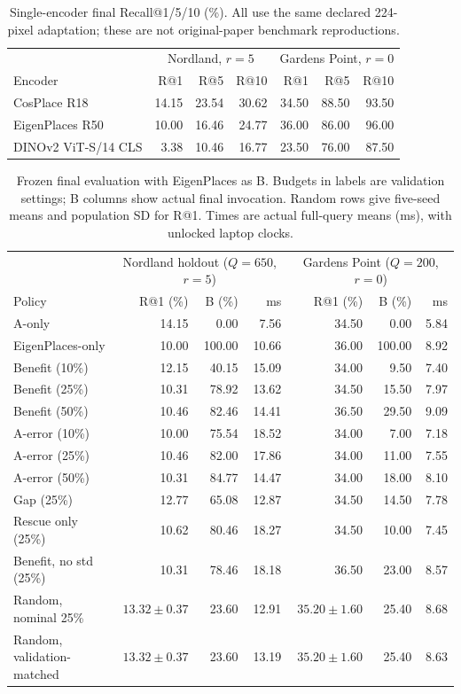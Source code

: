 \documentclass[conference]{IEEEtran}
\begin{document}
\begin{table}[t]
\caption{Single-encoder final Recall@1/5/10 (\%). All use the same declared 224-pixel adaptation; these are not original-paper benchmark reproductions.}
\label{tab:baselines}
\centering
\begin{tabular}{lrrr rrr}
\toprule
&\multicolumn{3}{c}{Nordland, $r=5$}&\multicolumn{3}{c}{Gardens Point, $r=0$}\\
Encoder & R@1 & R@5 & R@10 & R@1 & R@5 & R@10\\
\midrule
CosPlace R18 & 14.15 & 23.54 & 30.62 & 34.50 & 88.50 & 93.50\\
EigenPlaces R50 & 10.00 & 16.46 & 24.77 & 36.00 & 86.00 & 96.00\\
DINOv2 ViT-S/14 CLS & 3.38 & 10.46 & 16.77 & 23.50 & 76.00 & 87.50\\
\bottomrule
\end{tabular}
\end{table}
\begin{table}[t]
\caption{Frozen final evaluation with EigenPlaces as B. Budgets in labels are validation settings; B columns show actual final invocation. Random rows give five-seed means and population SD for R@1. Times are actual full-query means (ms), with unlocked laptop clocks.}
\label{tab:final}
\centering
\begin{tabular}{lrrr rrr}
\toprule
&\multicolumn{3}{c}{Nordland holdout ($Q=650$, $r=5$)}&\multicolumn{3}{c}{Gardens Point ($Q=200$, $r=0$)}\\
Policy & R@1 (\%) & B (\%) & ms & R@1 (\%) & B (\%) & ms\\
\midrule
A-only & 14.15 & 0.00 & 7.56 & 34.50 & 0.00 & 5.84\\
EigenPlaces-only & 10.00 & 100.00 & 10.66 & 36.00 & 100.00 & 8.92\\
Benefit (10\%) & 12.15 & 40.15 & 15.09 & 34.00 & 9.50 & 7.40\\
Benefit (25\%) & 10.31 & 78.92 & 13.62 & 34.50 & 15.50 & 7.97\\
Benefit (50\%) & 10.46 & 82.46 & 14.41 & 36.50 & 29.50 & 9.09\\
A-error (10\%) & 10.00 & 75.54 & 18.52 & 34.00 & 7.00 & 7.18\\
A-error (25\%) & 10.46 & 82.00 & 17.86 & 34.00 & 11.00 & 7.55\\
A-error (50\%) & 10.31 & 84.77 & 14.47 & 34.00 & 18.00 & 8.10\\
Gap (25\%) & 12.77 & 65.08 & 12.87 & 34.50 & 14.50 & 7.78\\
Rescue only (25\%) & 10.62 & 80.46 & 18.27 & 34.50 & 10.00 & 7.45\\
Benefit, no std (25\%) & 10.31 & 78.46 & 18.18 & 36.50 & 23.00 & 8.57\\
Random, nominal 25\% & $13.32\pm0.37$ & 23.60 & 12.91 & $35.20\pm1.60$ & 25.40 & 8.68\\
Random, validation-matched & $13.32\pm0.37$ & 23.60 & 13.19 & $35.20\pm1.60$ & 25.40 & 8.63\\
\bottomrule
\end{tabular}
\end{table}
\end{document}
